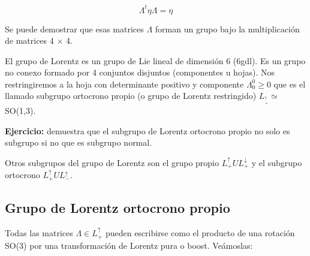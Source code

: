 \documentclass{article}
\begin{document}
        $$\Lambda ^t \eta \Lambda =\eta$$


        Se puede demostrar que esas matrices $\Lambda$ forman un grupo bajo la multiplicación de matrices 4 $\times$ 4.

        \smallskip
        El grupo de Lorentz es un grupo de Lie lineal de dimensión 6 (6gdl). Es un grupo no conexo formado por 4 conjuntos disjuntos (componentes u hojas). Nos restringiremos a la hoja con determinante positivo y componente $\Lambda _0^0 \geq 0$ que es el llamado subgrupo ortocrono propio (o grupo de Lorentz restringido) $L__+^\uparrow \simeq$ SO(1,3).

        \smallskip
        \textbf{Ejercicio:} demuestra que el subgrupo de Lorentz ortocrono propio no solo es subgrupo si no que es subgrupo normal.

        Otros subgrupos del grupo de Lorentz son el grupo propio $L_+^\uparrow U L_+^\downarrow$ y el subgrupo ortocrono $L_+^\uparrow U L_-^\uparrow$.

        \subsection{Grupo de Lorentz ortocrono propio}

        Todas las matrices $\Lambda \in L_+^\uparrow$ pueden escribirse como el producto de una rotación SO(3) por una transformación de Lorentz pura o boost. Veámoslas:
\end{document}
